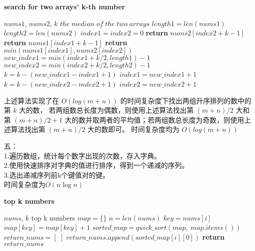 \documentclass{article}
\begin{document}
\begin{algorithm}
    \caption{\textbf{search for two arrays' k-th number}}
    \label{alg:arrays_k-th}
    \begin{algorithmic}[1]
        \REQUIRE $nums1$, $nums2$, $k$
        \ENSURE $the\; median\; of\; the\; two\; arrays$
        \STATE $length1 = len(nums1)$
        \STATE $length2 = len(nums2)$
        \STATE $index1 = index2 = 0$
        \STATE \textbf{return} $nums2[index2 + k - 1]$
        \ENDIF
        \STATE \textbf{return} $nums1[index1 + k - 1]$
        \ENDIF
        \STATE \textbf{return} $min(nums1[index1], nums2[index2])$
        \ENDIF
        \STATE $new\_index1 = min(index1 + k / 2, length1) - 1$
        \STATE $new\_index2 = min(index2 + k / 2, length2) - 1$
        \STATE $k = k - (new\_index1 - index1 + 1)$
        \STATE $index1 = new\_index1 + 1$
        \ELSE
        \STATE $k = k - (new\_index2 - index2 + 1)$
        \STATE $index2 = new\_index2 + 1$
        \ENDIF
        \ENDWHILE
    \end{algorithmic}
\end{algorithm}

上述算法实现了在 $O(log(m + n))$ 的时间复杂度下找出两组升序排列的数中的第 $k$ 大的数，
若两组数总长度为偶数，则使用上述算法找出第 $(m + n) / 2$ 大和第 $(m + n) / 2 + 1$ 
大的数并取两者的平均值；若两组数总长度为奇数，则使用上述算法找出第 $(m + n) / 2$ 大的数即可。
时间复杂度均为 $O(log(m + n))$ 


\newpage
五：
\\
1.遍历数组，统计每个数字出现的次数，存入字典。
\\
2.使用快速排序对字典的值进行排序，得到一个递减的序列。
\\
3.选出递减序列前k个键值对的键。
\\
时间复杂度为$O(n \log n)$

\begin{algorithm}
    \caption{\textbf{top k numbers}}
    \label{alg:top_k}
    \begin{algorithmic}[1]
        \REQUIRE $nums$, $k$
        \ENSURE top k numbers
        \STATE $map = \{\}$
        \STATE $n = len(nums)$
        \STATE $key = nums[i]$
        \STATE $map[key] = map[key] + 1$
        \ENDFOR
        \STATE $sorted\_map = quick\_sort(map,\; map.items())$
        \STATE $return\_nums = [\;]$
        \STATE $return\_nums.append(sorted\_map[i][0])$
        \ENDIF
        \ENDFOR
        \STATE \textbf{return} $return\_nums$
    \end{algorithmic}
\end{algorithm}
\end{document}
